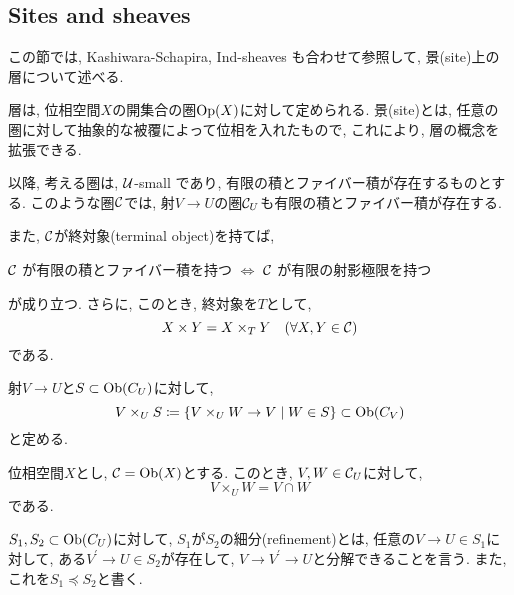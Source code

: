 \documentclass[../main]{subfiles}
\begin{document}
\setcounter{section}{2}
\setcounter{subsection}{1} \addtocounter{subsection}{-1}
\subsection{Sites and sheaves}
この節では,
Kashiwara-Schapira, Ind-sheaves \cite{book:KS_ind}
も合わせて参照して,
景(site)上の層について述べる.

\vspace{0.5em}
層は, 位相空間$X$の開集合の圏$\mathrm{Op}(X)$に対して定められる.
景(site)とは, 任意の圏に対して抽象的な被覆によって位相を入れたもので,
これにより, 層の概念を拡張できる.

以降, 考える圏は, $\mathcal{U}$-small であり,
有限の積とファイバー積が存在するものとする.
このような圏$\mathcal{C}$では,
射$V\to U$の圏$\mathcal{C}_U$も有限の積とファイバー積が存在する.

また, $\mathcal{C}$が終対象(terminal object)を持てば,
\begin{center}
  $\mathcal{C}$ が有限の積とファイバー積を持つ
  $\iff$
  $\mathcal{C}$ が有限の射影極限を持つ
\end{center}
が成り立つ.
さらに, このとき, 終対象を$T$として,
\[
  X\times Y = X\times_T Y \hspace{1em} (\forall X, Y\in \mathcal{C})
\]
である.

\begin{sym*}
  射$V\to U$と$S\subset \mathrm{Ob}(C_U)$に対して,
  \[
    V\times_U S
    \coloneqq
    \left\{
      V \times_U W \to V
      \mathrel{}\middle|\mathrel{}
      W\in S
      \right\} \subset \mathrm{Ob}(C_V)
  \]
  と定める.
\end{sym*}

\begin{rem*}
  位相空間$X$とし, $\mathcal{C} = \mathrm{Ob}(X)$とする.
  このとき,
  $V,W\in\mathcal{C}_U$に対して,
  \[
    V\times_U W = V\cap W
  \]
  である.
\end{rem*}

\begin{dfn}
  $S_1,S_2\subset \mathrm{Ob}(C_U)$に対して,
  $S_1$が$S_2$の細分(refinement)とは,
  任意の$V\to U \in S_1$に対して,
  ある$V^\prime\to U\in S_2$が存在して,
  $V\to V^\prime \to U$と分解できることを言う.
  また, これを$S_1 \preceq S_2$と書く.
\end{dfn}
\end{document}
